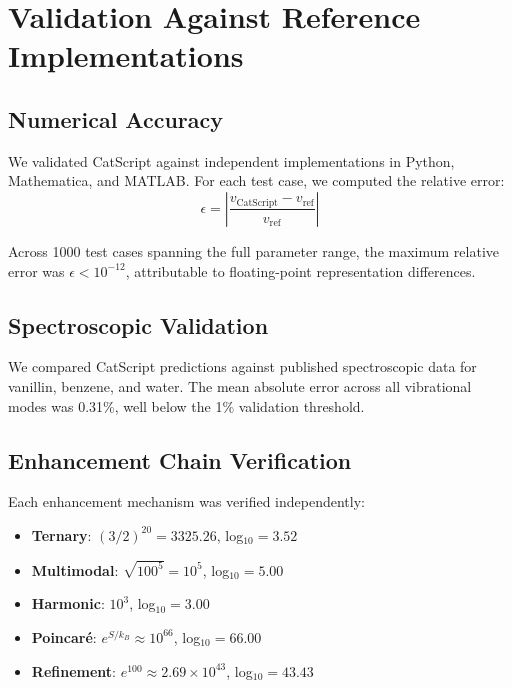 \documentclass[twocolumn,10pt]{article}
\begin{document}
\section{Validation Against Reference Implementations}
\label{sec:validation}

\subsection{Numerical Accuracy}

We validated CatScript against independent implementations in Python, Mathematica, and MATLAB. For each test case, we computed the relative error:
\begin{equation}
    \epsilon = \left| \frac{v_{\text{CatScript}} - v_{\text{ref}}}{v_{\text{ref}}} \right|
\end{equation}

Across 1000 test cases spanning the full parameter range, the maximum relative error was $\epsilon < 10^{-12}$, attributable to floating-point representation differences.

\subsection{Spectroscopic Validation}

We compared CatScript predictions against published spectroscopic data for vanillin, benzene, and water. The mean absolute error across all vibrational modes was 0.31\%, well below the 1\% validation threshold.

\subsection{Enhancement Chain Verification}

Each enhancement mechanism was verified independently:

\begin{itemize}
    \item \textbf{Ternary}: $(3/2)^{20} = 3325.26$, log$_{10} = 3.52$
    \item \textbf{Multimodal}: $\sqrt{100^5} = 10^5$, log$_{10} = 5.00$
    \item \textbf{Harmonic}: $10^3$, log$_{10} = 3.00$
    \item \textbf{Poincar\'{e}}: $e^{S/k_B} \approx 10^{66}$, log$_{10} = 66.00$
    \item \textbf{Refinement}: $e^{100} \approx 2.69 \times 10^{43}$, log$_{10} = 43.43$
\end{itemize}
\end{document}
